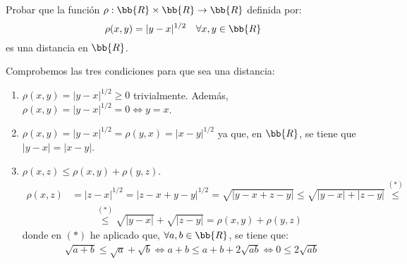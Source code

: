 \begin{ejercicio}
    Probar que la función $\rho : \bb{R} \times \bb{R} \rightarrow \bb{R}$ definida por:
    \begin{equation*}
        \rho (x,y)=|y-x|^{1/2} \quad \forall x,y \in \bb{R}
    \end{equation*}
    es una distancia en $\bb{R}$.

    Comprobemos las tres condiciones para que sea una distancia:
    \begin{enumerate}
        \item $\rho (x,y)=|y-x|^{1/2}\geq 0$ trivialmente. Además, $\rho (x,y)=|y-x|^{1/2}=0 \Longleftrightarrow y=x$.

        \item $\rho (x,y)=|y-x|^{1/2}=\rho (y,x)=|x-y|^{1/2}$ ya que, en $\bb{R}$, se tiene que $|y-x|=|x-y|$.

        \item $\rho (x,z)\leq \rho (x,y) + \rho(y,z)$.
        \begin{equation*}\begin{split}
            \rho (x,z)&=|z-x|^{1/2} = |z-x+y-y|^{1/2} = \sqrt{|y-x+z-y|}
            \leq \sqrt{|y-x|+|z-y|} \stackrel{(\ast)}{\leq} \\
            & \hspace{1cm} \stackrel{(\ast)}{\leq} \sqrt{|y-x|} + \sqrt{|z-y|} = \rho (x,y) + \rho(y,z)
        \end{split}\end{equation*}
        donde en $(\ast)$ he aplicado que, $\forall a,b\in \bb{R}$, se tiene que:
        \begin{multline*}
            \sqrt{a+b}\leq \sqrt{a} + \sqrt{b} \Longleftrightarrow a+b \leq a+b + 2\sqrt{ab} \Longleftrightarrow 0\leq 2\sqrt{ab}
        \end{multline*}
    \end{enumerate}
    
\end{ejercicio}

